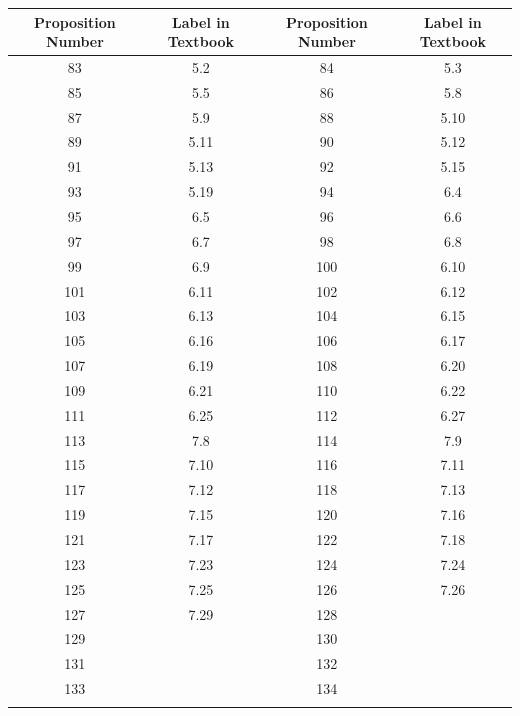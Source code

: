 \documentclass{book}
\newenvironment{allowTableDashes}{\ADLactivate}{\ADLinactivate}
\newcommand{\myVS}{\vphantom{$\int_a^b$}}
\begin{document}
\begin{allowTableDashes}
   \begin{tabular}{ c|c||c|c }
      Proposition Number & Label in Textbook & Proposition Number & Label in Textbook \\ \hline
      
      \myVS 83 & 5.2 & 84 & 5.3 \\ \hdashline[10pt/3pt]
      \myVS 85 & 5.5 & 86 & 5.8 \\ \hdashline[10pt/3pt]
      \myVS 87 & 5.9  & 88 & 5.10 \\ \hdashline[10pt/3pt]
      \myVS 89 & 5.11 & 90 & 5.12 \\ \hdashline[10pt/3pt]
      \myVS 91 & 5.13 & 92 & 5.15 \\ \hdashline[10pt/3pt]
      \myVS 93 & 5.19 & 94 & 6.4  \\ \hdashline[10pt/3pt]
      \myVS 95 & 6.5 & 96 & 6.6 \\ \hdashline[10pt/3pt]
      \myVS 97 & 6.7 & 98 & 6.8 \\ \hdashline[10pt/3pt]
      \myVS 99 & 6.9 & 100 & 6.10 \\ \hdashline[10pt/3pt]
      \myVS 101 & 6.11 & 102 & 6.12 \\ \hdashline[10pt/3pt]
      \myVS 103 & 6.13 & 104 & 6.15 \\ \hdashline[10pt/3pt]
      \myVS 105 & 6.16 & 106 & 6.17 \\ \hdashline[10pt/3pt]
      \myVS 107 & 6.19 & 108 & 6.20 \\ \hdashline[10pt/3pt]
      \myVS 109 & 6.21 & 110 & 6.22 \\ \hdashline[10pt/3pt]
      \myVS 111 & 6.25 & 112 & 6.27 \\ \hdashline[10pt/3pt]
      \myVS 113 & 7.8 & 114 & 7.9 \\ \hdashline[10pt/3pt]
      \myVS 115 & 7.10 & 116 & 7.11 \\ \hdashline[10pt/3pt]
      \myVS 117 & 7.12 & 118 & 7.13 \\ \hdashline[10pt/3pt]
      \myVS 119 & 7.15 & 120 & 7.16 \\ \hdashline[10pt/3pt]
      \myVS 121 & 7.17 & 122 & 7.18 \\ \hdashline[10pt/3pt]
      \myVS 123 & 7.23 & 124 & 7.24 \\ \hdashline[10pt/3pt]
      \myVS 125 & 7.25 & 126 & 7.26 \\ \hdashline[10pt/3pt]
      \myVS 127 & 7.29 & 128 &  \\ \hdashline[10pt/3pt]
      \myVS 129 &  & 130 &  \\ \hdashline[10pt/3pt]
      \myVS 131 &  & 132 &  \\ \hdashline[10pt/3pt]
      \myVS 133 &  & 134 &  \\ \hdashline[10pt/3pt]
   \end{tabular}

\end{allowTableDashes}
\end{document}
